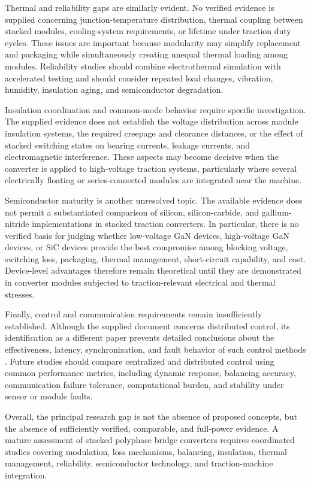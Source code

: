 Thermal and reliability gaps are similarly evident. No verified evidence is supplied concerning junction-temperature distribution, thermal coupling between stacked modules, cooling-system requirements, or lifetime under traction duty cycles. These issues are important because modularity may simplify replacement and packaging while simultaneously creating unequal thermal loading among modules. Reliability studies should combine electrothermal simulation with accelerated testing and should consider repeated load changes, vibration, humidity, insulation aging, and semiconductor degradation. %

Insulation coordination and common-mode behavior require specific investigation. The supplied evidence does not establish the voltage distribution across module insulation systems, the required creepage and clearance distances, or the effect of stacked switching states on bearing currents, leakage currents, and electromagnetic interference. These aspects may become decisive when the converter is applied to high-voltage traction systems, particularly where several electrically floating or series-connected modules are integrated near the machine. %

Semiconductor maturity is another unresolved topic. The available evidence does not permit a substantiated comparison of silicon, silicon-carbide, and gallium-nitride implementations in stacked traction converters. In particular, there is no verified basis for judging whether low-voltage GaN devices, high-voltage GaN devices, or SiC devices provide the best compromise among blocking voltage, switching loss, packaging, thermal management, short-circuit capability, and cost. Device-level advantages therefore remain theoretical until they are demonstrated in converter modules subjected to traction-relevant electrical and thermal stresses. %

Finally, control and communication requirements remain insufficiently established. Although the supplied document concerns distributed control, its identification as a different paper prevents detailed conclusions about the effectiveness, latency, synchronization, and fault behavior of such control methods \cite{Jin2017}. Future studies should compare centralized and distributed control using common performance metrics, including dynamic response, balancing accuracy, communication failure tolerance, computational burden, and stability under sensor or module faults.

Overall, the principal research gap is not the absence of proposed concepts, but the absence of sufficiently verified, comparable, and full-power evidence. A mature assessment of stacked polyphase bridge converters requires coordinated studies covering modulation, loss mechanisms, balancing, insulation, thermal management, reliability, semiconductor technology, and traction-machine integration. %